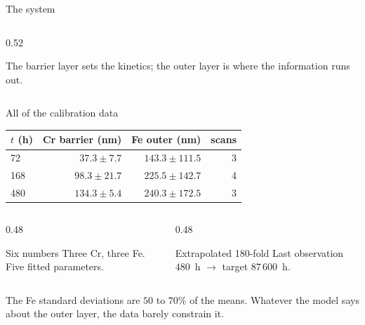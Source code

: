 \documentclass[aspectratio=169,10pt]{beamer}
\newcommand{\Cx}{C_{x}}
\begin{document}
\begin{frame}{The system}
\begin{columns}[T]
\begin{column}{0.52\textwidth}

\vspace{0.2em}
{\tiny The barrier layer sets the kinetics; the outer layer is where the
information runs out.}
\end{column}
\end{columns}
\end{frame}

\begin{frame}{All of the calibration data}
\centering
\begin{tabular}{lrrr}
\toprule
$t$ (h) & Cr barrier (nm) & Fe outer (nm) & scans \\
\midrule
72  & $37.3 \pm 7.7$  & $143.3 \pm 111.5$ & 3 \\
168 & $98.3 \pm 21.7$ & $225.5 \pm 142.7$ & 4 \\
480 & $134.3 \pm 5.4$ & $240.3 \pm 172.5$ & 3 \\
\bottomrule
\end{tabular}

\vspace{1em}
\begin{columns}[T]
\begin{column}{0.48\textwidth}
\begin{alertblock}{Six numbers}
Three Cr, three Fe. Five fitted parameters.
\end{alertblock}
\end{column}
\begin{column}{0.48\textwidth}
\begin{alertblock}{Extrapolated 180-fold}
Last observation $480$~h $\rightarrow$ target $87\,600$~h.
\end{alertblock}
\end{column}
\end{columns}

\vspace{0.6em}
\small
The Fe standard deviations are $50$ to $70\%$ of the means. Whatever the
model says about the outer layer, the data barely constrain it.
\end{frame}

\end{document}

